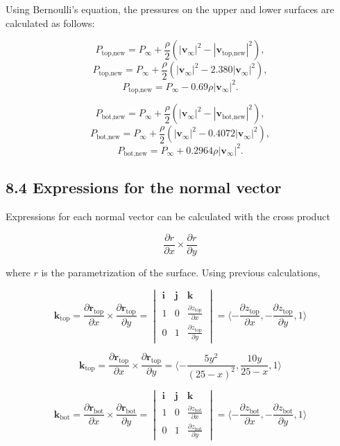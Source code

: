 \documentclass[12pt]{article}
\begin{document}
Using Bernoulli's equation, the pressures on the upper and lower surfaces are calculated as follows:


\[
P_{\text{top,new}} = P_\infty + \frac{\rho}{2} \left(|\mathbf{v}_\infty|^2 - |\mathbf{v}_{\text{top,new}}|^2 \right),
\]
\[
P_{\text{top,new}} = P_\infty + \frac{\rho}{2} \left(|\mathbf{v}_\infty|^2 - 2.380 |\mathbf{v}_\infty|^2 \right),
\]
\[
P_{\text{top,new}} = P_\infty - 0.69\rho |\mathbf{v}_\infty|^2 .
\]

\[
P_{\text{bot,new}} = P_\infty + \frac{\rho}{2} \left(|\mathbf{v}_\infty|^2 - |\mathbf{v}_{\text{bot,new}}|^2 \right),
\]
\[
P_{\text{bot,new}} = P_\infty + \frac{\rho}{2} \left(|\mathbf{v}_\infty|^2 - 0.4072 |\mathbf{v}_\infty|^2 \right),
\]
\[
P_{\text{bot,new}} = P_\infty + 0.2964 \rho|\mathbf{v}_\infty|^2 .
\]


\subsection*{8.4 Expressions for the normal vector}

Expressions for each normal vector can be calculated with the cross product 

\[ \frac{\partial r}{\partial x} \times \frac{\partial r}{\partial y} \]

where $r$ is the parametrization of the surface. Using previous calculations, 

\[
\mathbf{k}_\text{top} = \frac{\partial \mathbf{r}_{\text{top}}}{\partial x} \times \frac{\partial \mathbf{r}_{\text{top}}}{\partial y} =
\begin{vmatrix}
\mathbf{i} & \mathbf{j} & \mathbf{k} \\
1 & 0 & \frac{\partial z_{\text{top}}}{\partial x} \\
0 & 1 & \frac{\partial z_{\text{top}}}{\partial y}
\end{vmatrix} = \langle -\frac{\partial z_{\text{top}}}{\partial x}, -\frac{\partial z_{\text{top}}}{\partial y}, 1 \rangle
\] 

\[\mathbf{k}_\text{top} = \frac{\partial \mathbf{r}_{\text{top}}}{\partial x} \times \frac{\partial \mathbf{r}_{\text{top}}}{\partial y} = \langle -\frac{5y^2}{(25 - x)^2}, \frac{10y}{25 - x}, 1 \rangle\]

\[\mathbf{k}_\text{bot} = \frac{\partial \mathbf{r}_{\text{bot}}}{\partial x} \times \frac{\partial \mathbf{r}_{\text{bot}}}{\partial y} =
\begin{vmatrix}
\mathbf{i} & \mathbf{j} & \mathbf{k} \\
1 & 0 & \frac{\partial z_{\text{bot}}}{\partial x} \\
0 & 1 & \frac{\partial z_{\text{bot}}}{\partial y}
\end{vmatrix} = \langle -\frac{\partial z_{\text{bot}}}{\partial x}, -\frac{\partial z_{\text{bot}}}{\partial y}, 1 \rangle \]
\end{document}
